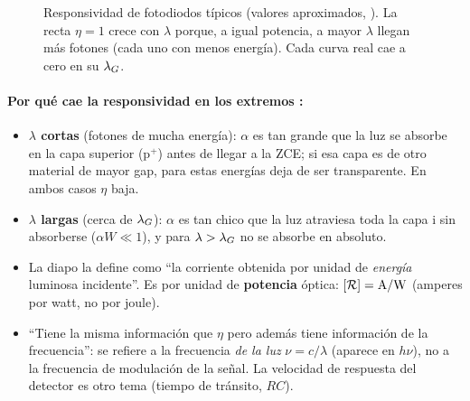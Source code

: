 \begin{figure}[H]
\centering
{}
\caption{Responsividad de fotodiodos típicos (valores aproximados, ). La recta
$\eta=1$ crece con $\lambda$ porque, a igual potencia, a mayor $\lambda$ llegan más fotones
(cada uno con menos energía). Cada curva real cae a cero en su $\lG$.}
\label{fig:responsividad}
\end{figure}

\paragraph{Por qué cae la responsividad en los extremos :}
\begin{itemize}
  \item \textbf{$\lambda$ cortas} (fotones de mucha energía): $\alpha$ es tan grande que la luz
  se absorbe en la capa superior (p$^+$) antes de llegar a la ZCE; si esa capa es de otro
  material de mayor gap, para estas energías deja de ser transparente. En ambos casos
  $\eta$ baja.
  \item \textbf{$\lambda$ largas} (cerca de $\lG$): $\alpha$ es tan chico que la luz atraviesa
  toda la capa i sin absorberse ($\alpha W\ll1$), y para $\lambda>\lG$ no se absorbe en
  absoluto.
\end{itemize}

\begin{ojo}
\begin{itemize}
  \item La diapo la define como ``la corriente obtenida por unidad de \emph{energía}
  luminosa incidente''. Es por unidad de \textbf{potencia} óptica: $[\Resp]=\si{A/W}$
  (amperes por watt, no por joule).
  \item ``Tiene la misma información que $\eta$ pero además tiene información de la
  frecuencia'': se refiere a la frecuencia \emph{de la luz} $\nu=c/\lambda$ (aparece en
  $h\nu$), no a la frecuencia de modulación de la señal. La velocidad de respuesta del
  detector es otro tema (tiempo de tránsito, $RC$).
\end{itemize}
\end{ojo}

